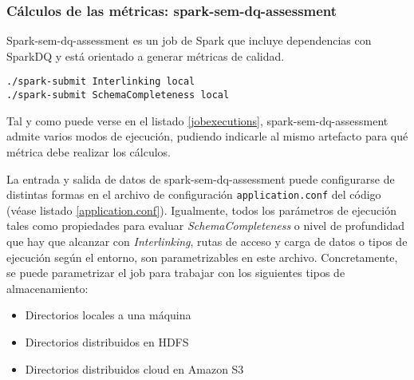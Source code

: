 \subsubsection{Cálculos de las métricas: spark-sem-dq-assessment}

Spark-sem-dq-assessment es un job de Spark que incluye dependencias con SparkDQ
y está orientado a generar métricas de calidad. 

\lstset{escapechar=@,language=bash}
\begin{lstlisting}[caption={Tipos de ejecución del job},captionpos=b,
    label=jobexecutions]
./spark-submit Interlinking local
./spark-submit SchemaCompleteness local
\end{lstlisting}

Tal y como puede verse en el listado \ref{jobexecutions},
spark-sem-dq-assessment admite varios modos de ejecución, pudiendo indicarle al
mismo artefacto para qué métrica debe realizar los cálculos. 

La entrada y salida de datos de spark-sem-dq-assessment puede configurarse
  de distintas formas en el archivo de configuración \texttt{application.conf}
  del código (véase listado \ref{application.conf}). Igualmente, todos los
  parámetros de ejecución tales como propiedades para evaluar
  \textit{SchemaCompleteness} o nivel de profundidad que hay que alcanzar con
  \textit{Interlinking}, rutas de acceso y carga de datos o tipos de ejecución
  según el entorno, son parametrizables en este archivo. Concretamente, se puede
  parametrizar el job para trabajar con los siguientes tipos de almacenamiento: 
 
  \begin{itemize}
  \item Directorios locales a una máquina
  \item Directorios distribuidos en \acs{HDFS}
  \item Directorios distribuidos cloud en Amazon S3
  \end{itemize}


